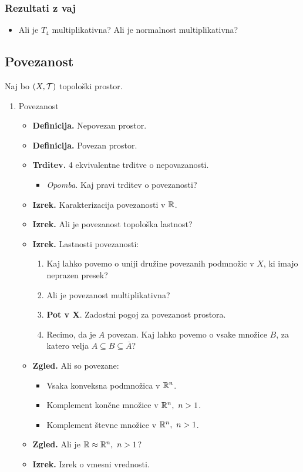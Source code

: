 \subsubsection*{Rezultati z vaj}
\begin{itemize}
    \item Ali je $T_4$ multiplikativna? Ali je normalnost multiplikativna?
\end{itemize}

\subsection{Povezanost}
Naj bo $(X, \mathcal{T})$ topološki prostor.
\begin{enumerate}
    \item Povezanost
    \begin{itemize}
        \item \textbf{Definicija.} Nepovezan prostor.
        \item \textbf{Definicija.} Povezan prostor.
        \item \textbf{Trditev.} 4 ekvivalentne trditve o nepovazanosti.
        \begin{itemize}
            \item \colorbox{yellow!30}{\emph{Opomba.}} Kaj pravi trditev o povezanosti?
        \end{itemize}
        \item \textbf{Izrek.} Karakterizacija povezanosti v $\mathbb{R}$.        
        \item \textbf{Izrek.} Ali je povezanost topološka lastnost?
        \item \textbf{Izrek.} Lastnosti povezanosti:
        \begin{enumerate}
            \item Kaj lahko povemo o uniji družine povezanih podmnožic v $X$, ki imajo neprazen presek?
            \item Ali je povezanost multiplikativna?
            \item \textbf{Pot v X}. Zadostni pogoj za povezanost prostora.
            \item Recimo, da je $A$ povezan. Kaj lahko povemo o vsake množice $B$, za katero velja $A \subseteq B \subseteq \overline{A}$?
        \end{enumerate}
        \item \textbf{Zgled.} Ali so povezane:
        \begin{itemize}
            \item Vsaka konveksna podmnožica v $\mathbb{R}^n$.
            \item Komplement končne množice v $\mathbb{R}^n, \ n > 1$.
            \item Komplement števne množice v $\mathbb{R}^n, \ n > 1$.
        \end{itemize}
        \item \textbf{Zgled.} Ali je $\mathbb{R} \approx \mathbb{R}^n, \ n > 1$?
        \item \textbf{Izrek.} Izrek o vmesni vrednosti.
    \end{itemize}
    

\end{enumerate}
